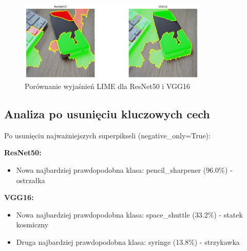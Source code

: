 \documentclass[12pt,a4paper]{article}
\begin{document}
\begin{figure}[H]
  \centering
  \includegraphics[width=0.8\textwidth]{../out/ResNet50vsVGG16.png}
  \caption{Porównanie wyjaśnień LIME dla ResNet50 i VGG16}
\end{figure}

\subsection{Analiza po usunięciu kluczowych cech}

Po usunięciu najważniejszych superpikseli (negative\_only=True):

\textbf{ResNet50:}
\begin{itemize}
  \item Nowa najbardziej prawdopodobna klasa: pencil\_sharpener (96.0\%) - ostrzałka
\end{itemize}

\textbf{VGG16:}
\begin{itemize}
  \item Nowa najbardziej prawdopodobna klasa: space\_shuttle (33.2\%) - statek kosmiczny
  \item Druga najbardziej prawdopodobna klasa: syringe (13.8\%) - strzykawka
\end{itemize}
\end{document}
